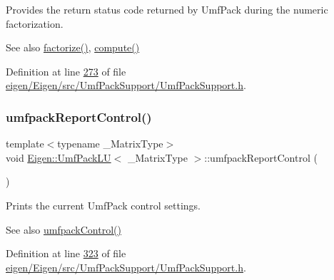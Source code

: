 Provides the return status code returned by Umf\+Pack during the numeric factorization.

\begin{DoxySeeAlso}{See also}
\hyperlink{class_eigen_1_1_umf_pack_l_u_a1471bf890503e743c45d75cc02a5345d}{factorize()}, \hyperlink{class_eigen_1_1_umf_pack_l_u_a05fb2b5717ebd67e46b83439721ceee7}{compute()} 
\end{DoxySeeAlso}


Definition at line \hyperlink{eigen_2_eigen_2src_2_umf_pack_support_2_umf_pack_support_8h_source_l00273}{273} of file \hyperlink{eigen_2_eigen_2src_2_umf_pack_support_2_umf_pack_support_8h_source}{eigen/\+Eigen/src/\+Umf\+Pack\+Support/\+Umf\+Pack\+Support.\+h}.

\mbox{\label{class_eigen_1_1_umf_pack_l_u_ac6ff58ef8eb8221e6af87de750d6619b}} 
\subsubsection{\texorpdfstring{umfpack\+Report\+Control()}{umfpackReportControl()}\hspace{0.1cm}{\footnotesize\ttfamily [1/2]}}
{\footnotesize\ttfamily template$<$typename \+\_\+\+Matrix\+Type$>$ \\
void \hyperlink{class_eigen_1_1_umf_pack_l_u}{Eigen\+::\+Umf\+Pack\+LU}$<$ \+\_\+\+Matrix\+Type $>$\+::umfpack\+Report\+Control (\begin{DoxyParamCaption}{ }\end{DoxyParamCaption})\hspace{0.3cm}{\ttfamily [inline]}}

Prints the current Umf\+Pack control settings.

\begin{DoxySeeAlso}{See also}
\hyperlink{class_eigen_1_1_umf_pack_l_u_a679bd267a0407d4ca985d97f0b864101}{umfpack\+Control()} 
\end{DoxySeeAlso}


Definition at line \hyperlink{eigen_2_eigen_2src_2_umf_pack_support_2_umf_pack_support_8h_source_l00323}{323} of file \hyperlink{eigen_2_eigen_2src_2_umf_pack_support_2_umf_pack_support_8h_source}{eigen/\+Eigen/src/\+Umf\+Pack\+Support/\+Umf\+Pack\+Support.\+h}.

